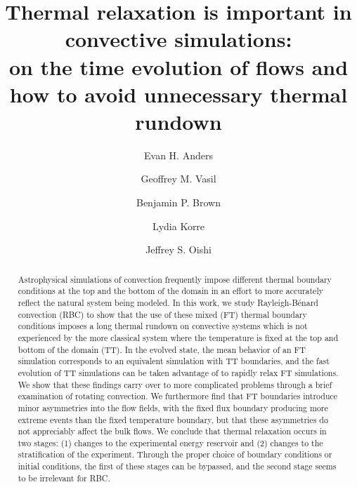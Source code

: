 \documentclass[aps, pre, onecolumn, nofootinbib, notitlepage, groupedaddress, amsfonts, amssymb, amsmath, longbibliography, superscriptaddress]{revtex4-1}
\newcommand{\RB}{Rayleigh-B\'{e}nard }
\begin{document}
\author{Evan H. Anders}
\author{Geoffrey M. Vasil}
\author{Benjamin P. Brown}
\author{Lydia Korre}
\author{Jeffrey S. Oishi}

\title{Thermal relaxation is important in convective simulations: \\
on the time evolution of flows and how to avoid unnecessary thermal rundown}

\begin{abstract}
Astrophysical simulations of convection frequently impose different thermal boundary conditions at the top and the bottom of the domain in an effort to more accurately reflect the natural system being modeled.
In this work, we study \RB convection (RBC) to show that the use of these mixed (FT) thermal boundary conditions imposes a long thermal rundown on convective systems which is not experienced by the more classical system where the temperature is fixed at the top and bottom of the domain (TT).
In the evolved state, the mean behavior of an FT simulation corresponds to an equivalent simulation with TT boundaries, and the fast evolution of TT simulations can be taken advantage of to rapidly relax FT simulations.
We show that these findings carry over to more complicated problems through a brief examination of rotating convection.
We furthermore find that FT boundaries introduce minor asymmetries into the flow fields, with the fixed flux boundary producing more extreme events than the fixed temperature boundary, but that these asymmetries do not appreciably affect the bulk flows.
We conclude that thermal relaxation occurs in two stages: (1) changes to the experimental energy reservoir and (2) changes to the stratification of the experiment.
Through the proper choice of boundary conditions or initial conditions, the first of these stages can be bypassed, and the second stage seems to be irrelevant for RBC.
\end{abstract}
\maketitle
\end{document}
